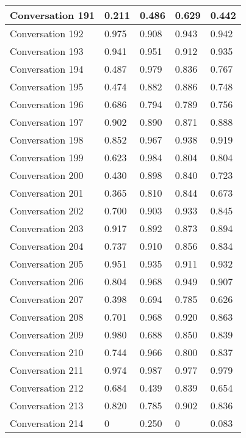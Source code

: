\begin{table}[]
\begin{tabular}{|l|l|l|l|l|}
Conversation 191 & 0.211    & 0.486 & 0.629       & 0.442   \\ \hline
Conversation 192 & 0.975    & 0.908 & 0.943       & 0.942   \\ \hline
Conversation 193 & 0.941    & 0.951 & 0.912       & 0.935   \\ \hline
Conversation 194 & 0.487    & 0.979 & 0.836       & 0.767   \\ \hline
Conversation 195 & 0.474    & 0.882 & 0.886       & 0.748   \\ \hline
Conversation 196 & 0.686    & 0.794 & 0.789       & 0.756   \\ \hline
Conversation 197 & 0.902    & 0.890 & 0.871       & 0.888   \\ \hline
Conversation 198 & 0.852    & 0.967 & 0.938       & 0.919   \\ \hline
Conversation 199 & 0.623    & 0.984 & 0.804       & 0.804   \\ \hline
Conversation 200 & 0.430    & 0.898 & 0.840       & 0.723   \\ \hline
Conversation 201 & 0.365    & 0.810 & 0.844       & 0.673   \\ \hline
Conversation 202 & 0.700    & 0.903 & 0.933       & 0.845   \\ \hline
Conversation 203 & 0.917    & 0.892 & 0.873       & 0.894   \\ \hline
Conversation 204 & 0.737    & 0.910 & 0.856       & 0.834   \\ \hline
Conversation 205 & 0.951    & 0.935 & 0.911       & 0.932   \\ \hline
Conversation 206 & 0.804    & 0.968 & 0.949       & 0.907   \\ \hline
Conversation 207 & 0.398    & 0.694 & 0.785       & 0.626   \\ \hline
Conversation 208 & 0.701    & 0.968 & 0.920       & 0.863   \\ \hline
Conversation 209 & 0.980    & 0.688 & 0.850       & 0.839   \\ \hline
Conversation 210 & 0.744    & 0.966 & 0.800       & 0.837   \\ \hline
Conversation 211 & 0.974    & 0.987 & 0.977       & 0.979   \\ \hline
Conversation 212 & 0.684    & 0.439 & 0.839       & 0.654   \\ \hline
Conversation 213 & 0.820    & 0.785 & 0.902       & 0.836   \\ \hline
Conversation 214 & 0        & 0.250 & 0           & 0.083   \\ \hline

\end{tabular}
\end{table}

